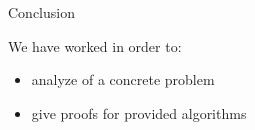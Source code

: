 \begin{frame}{Conclusion}

  We have worked in order to:

  \begin{itemize}[<+->]
    \item analyze of a concrete problem
    \item give proofs for provided algorithms
  \end{itemize}



\end{frame}